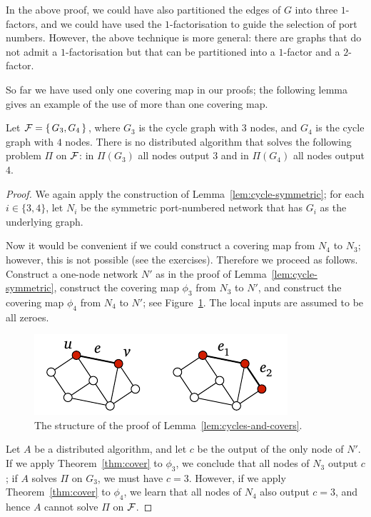In the above proof, we could have also partitioned the edges of $G$ into three $1$-factors, and we could have used the $1$-factorisation to guide the selection of port numbers. However, the above technique is more general: there are  graphs that do not admit a $1$-factorisation but that can be partitioned into a $1$-factor and a $2$-factor.

So far we have used only one covering map in our proofs; the following lemma gives an example of the use of more than one covering map.

\begin{lemma}\label{lem:cycles-and-covers}
    Let $\mathcal{F} = \{\, G_3, G_4 \,\}$, where $G_3$ is the cycle graph with $3$ nodes, and $G_4$ is the cycle graph with $4$ nodes. There is no distributed algorithm that solves the following problem $\Pi$ on $\mathcal{F}$: in $\Pi(G_3)$ all nodes output $3$ and in $\Pi(G_4)$ all nodes output $4$.
\end{lemma}
\begin{proof}
    We again apply the construction of Lemma~\ref{lem:cycle-symmetric}; for each $i \in \{3,4\}$, let $N_i$ be the symmetric port-numbered network that has $G_i$ as the underlying graph.
    
    Now it would be convenient if we could construct a covering map from $N_4$ to $N_3$; however, this is not possible (see the exercises). Therefore we proceed as follows. Construct a one-node network $N'$ as in the proof of Lemma~\ref{lem:cycle-symmetric}, construct the covering map $\phi_3$ from $N_3$ to $N'$, and construct the covering map $\phi_4$ from $N_4$ to $N'$; see Figure~\ref{fig:cycles-and-covers}. The local inputs are assumed to be all zeroes.

    \begin{figure}
        \centering
        \includegraphics[page=\PCyclesAndCovers]{figs.pdf}
        \caption{The structure of the proof of Lemma~\ref{lem:cycles-and-covers}.}\label{fig:cycles-and-covers}
    \end{figure}
    
    Let $A$ be a distributed algorithm, and let $c$ be the output of the only node of $N'$. If we apply Theorem~\ref{thm:cover} to $\phi_3$, we conclude that all nodes of $N_3$ output $c$; if $A$ solves $\Pi$ on $G_3$, we must have $c = 3$. However, if we apply Theorem~\ref{thm:cover} to $\phi_4$, we learn that all nodes of $N_4$ also output $c = 3$, and hence $A$ cannot solve $\Pi$ on $\mathcal{F}$.
\end{proof}

